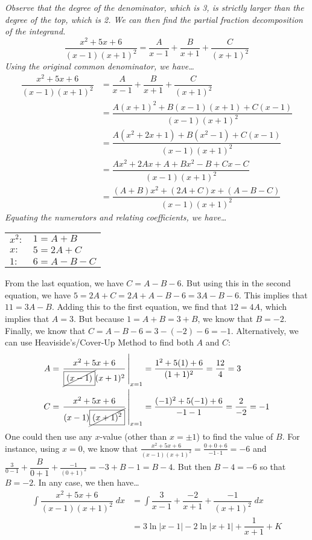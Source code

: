 \documentclass[12pt,letterpaper]{exam}
\begin{document}
\begin{questions}
{\footnotesize \itshape \tsol Observe that the degree of the denominator, which is 3, is strictly larger than the degree of the top, which is 2. We can then find the partial fraction decomposition of the integrand.
	\[
	\dfrac{x^2 + 5x + 6}{(x - 1)(x + 1)^2}= \dfrac{A}{x - 1} + \dfrac{B}{x + 1} + \dfrac{C}{(x + 1)^2}
	\]
Using the original common denominator, we have\dots
	\[
	\begin{aligned}
	\dfrac{x^2 + 5x + 6}{(x - 1)(x + 1)^2}&= \dfrac{A}{x - 1} + \dfrac{B}{x + 1} + \dfrac{C}{(x + 1)^2} \\
	&= \dfrac{A(x + 1)^2 + B(x - 1)(x + 1) + C(x - 1)}{(x - 1)(x + 1)^2} \\
	&= \dfrac{A(x^2 + 2x + 1) + B(x^2 - 1) + C(x - 1)}{(x - 1)(x + 1)^2} \\
	&= \dfrac{Ax^2 + 2Ax + A + Bx^2 - B + Cx - C}{(x - 1)(x + 1)^2} \\
	&= \dfrac{(A + B)x^2 + (2A + C)x + (A - B - C)}{(x - 1)(x + 1)^2}
	\end{aligned}
	\]
Equating the numerators and relating coefficients, we have\dots \par
	\begin{table}[!ht]
	\centering
	\begin{tabular}{ll}
	$x^2 \colon$ & $1= A + B$ \\
	$x \colon$ & $5= 2A + C$ \\
	$1 \colon$ & $6= A - B - C$
	\end{tabular}
	\end{table} \par
From the last equation, we have $C= A - B - 6$. But using this in the second equation, we have $5= 2A + C= 2A + A - B - 6= 3A - B - 6$. This implies that $11= 3A - B$. Adding this to the first equation, we find that $12= 4A$, which implies that $A= 3$. But because $1= A + B= 3 + B$, we know that $B= -2$. Finally, we know that $C= A - B - 6= 3 - (-2) - 6= -1$. Alternatively, we can use Heaviside's/Cover-Up Method to find both $A$ and $C$:
	\[
	\begin{aligned}
	A&= \left. \dfrac{x^2 + 5x + 6}{\cancel{\boxed{(x - 1)}} (x + 1)^2}\, \right|_{x=1}= \dfrac{1^2 + 5(1) + 6}{(1 + 1)^2}= \dfrac{12}{4}= 3 \\
	C&= \left. \dfrac{x^2 + 5x + 6}{(x - 1) \cancel{\boxed{(x + 1)^2}}}\, \right|_{x=1}= \dfrac{(-1)^2 + 5(-1) + 6}{-1 - 1}= \dfrac{2}{-2}= -1
	\end{aligned}
	\]
One could then use any $x$-value (other than $x= \pm 1$) to find the value of $B$. For instance, using $x= 0$, we know that $\frac{x^2 + 5x + 6}{(x - 1)(x + 1)^2}= \frac{0 + 0 + 6}{-1 \cdot 1}= -6$ and $\frac{3}{0 - 1} + \dfrac{B}{0 + 1} + \frac{-1}{(0 + 1)^2}= -3 + B - 1= B - 4$. But then $B - 4= -6$ so that $B= -2$. In any case, we then have\dots
	\[
	\begin{aligned}
	\int \dfrac{x^2 + 5x + 6}{(x - 1)(x + 1)^2} \;dx&= \int \dfrac{3}{x - 1} + \dfrac{-2}{x + 1} + \dfrac{-1}{(x + 1)^2} \; dx \\[0.3cm]
	&= 3 \ln|x - 1| - 2 \ln|x + 1| + \dfrac{1}{x + 1} + K 
	\end{aligned}
	\]
}

\end{questions}
\end{document}
